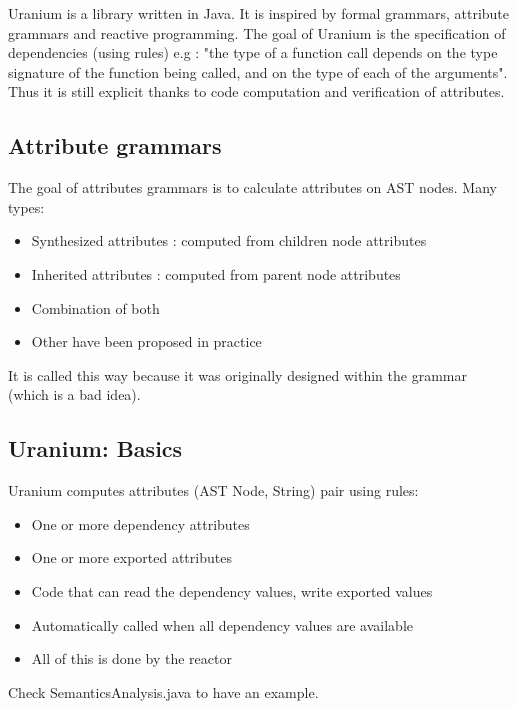 Uranium is a library written in Java. It is inspired by formal grammars,
attribute grammars and reactive programming. The goal of Uranium is the
specification of dependencies (using rules) e.g : "the type of a function call
depends on the type signature of the function being called, and on the type of
each of the arguments". Thus it is still explicit thanks to code computation and
verification of attributes.

    \subsection{Attribute grammars}
        The goal of attributes grammars is to calculate attributes on AST nodes.
        Many types:
        \begin{itemize}
            \item Synthesized attributes : computed from children node attributes
            \item Inherited attributes : computed from parent node attributes
            \item Combination of both
            \item Other have been proposed in practice 
        \end{itemize}

        It is called this way because it was originally designed within the
        grammar (which is a bad idea).
    
    \subsection{Uranium: Basics}
        Uranium computes attributes (AST Node, String) pair using rules:
        \begin{itemize}
            \item One or more dependency attributes
            \item One or more exported attributes
            \item Code that can read the dependency values, write exported values
            \item Automatically called when all dependency values are available
            \item All of this is done by the reactor
        \end{itemize}
        Check SemanticsAnalysis.java to have an example.
